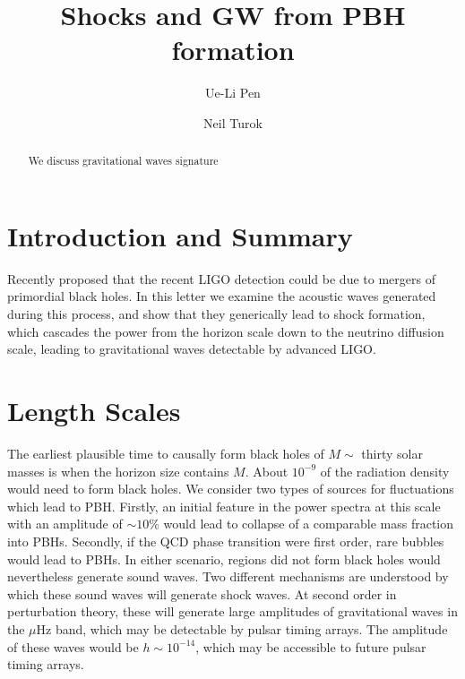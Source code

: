 \documentclass[aps,showpacs,twocolumn,floats,prd,superscriptaddress,nofootinbib]{revtex4}
\begin{document}
\title{Shocks and GW from PBH formation}


\author{Ue-Li Pen}

\author{Neil Turok}

\begin{abstract}
We discuss gravitational waves signature
\end{abstract}

\maketitle

\section{Introduction and Summary}

Recently \citet{2016arXiv160300464B} proposed that the recent LIGO
detection\cite{2016PhRvL.116f1102A} could be due to mergers of
primordial black holes.  In this letter we examine the acoustic waves
generated during this process, and show that they generically lead to
shock formation, which cascades the power from the horizon scale down
to the neutrino diffusion scale, leading to gravitational waves
detectable by advanced LIGO.

\section{Length Scales}

The earliest plausible time to causally form black holes of $M\sim$
thirty solar masses is when the horizon size contains $M$.  About
$10^{-9}$ of the radiation density would need to form black holes.  We
consider two types of sources for fluctuations which lead to PBH.
Firstly, an initial feature in the power spectra at this scale with an
amplitude of $\sim 10\%$ would lead to collapse of a comparable mass
fraction into PBHs.  Secondly, if the QCD phase transition were first
order, rare bubbles would lead to PBHs.  In either scenario, regions
did not form black holes would nevertheless generate sound waves.  Two
different mechanisms are understood by which these sound waves will
generate shock waves.  At second order in perturbation theory, these
will generate large amplitudes of gravitational waves in the $\mu$Hz
band\cite{2007PhRvD..76h4019B}, which may be detectable by pulsar
timing arrays.  The amplitude of these waves would be
$h \sim 10^{-14}$, which may be accessible to future pulsar timing
arrays\cite{kramer04}.
\end{document}
